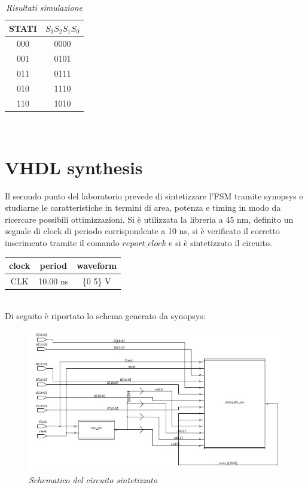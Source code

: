\begin{table}[!h]\footnotesize
	\centering
	\begin{tabular}{|c|c|}
		\hline
		\textbf{STATI} & \textbf{$S_{3}S_{2}S_{1}S_{0}$}\\
		\hline
		000 & 0000\\
		\hline
		001 &0101 \\
		\hline
		011& 0111\\
		\hline
		010& 1110\\
		\hline
		110& 1010\\
		\hline 
	\end{tabular}
	\caption{\textit{Risultati simulazione}}
	\label{tab2}
\end{table} \\
\section{VHDL synthesis}
Il secondo punto del laboratorio prevede di sintetizzare l’FSM tramite synopsys e studiarne le caratteristiche in termini di area, potenza e timing in modo da ricercare possibili ottimizzazioni. Si è utilizzata la libreria a 45 nm, definito un segnale di clock di periodo corrispondente a 10 ns, si è verificato il corretto inserimento tramite il comando \emph{$report\_clock$} e si è sintetizzato il circuito.\\
\begin{table}[!h]\footnotesize
	\centering
	\begin{tabular}{|c|c|c|}
		\hline
		\textbf{clock} & \textbf{period} & \textbf{waveform}\\
		\hline
		CLK & 10.00 ns & \{0 5\} V\\
		\hline
	\end{tabular}
\end{table} \\
Di seguito è riportato lo schema generato da synopsys:
\begin{figure}[!htb]
	\centering
	\includegraphics[scale=0.6]{immagini/schemlab2_2}
	\caption{\textit{Schematico del circuito sintetizzato}}
	\label{datapath}
\end{figure} \\
